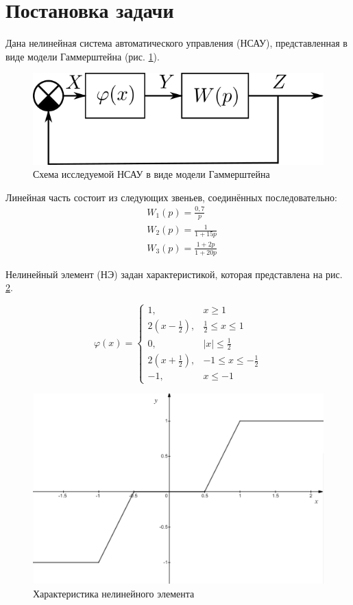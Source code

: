 


	
	
	\setcounter{page}{2}
	\tableofcontents
	\newpage
	
	\section{Постановка задачи}
	
	Дана нелинейная система автоматического управления (НСАУ), представленная в виде модели Гаммерштейна (рис. \ref{scheme}).
	
	\begin{figure}[h]
		\centering\includegraphics[width=.5\textwidth]{png/схема.png}
		\caption{Схема исследуемой НСАУ в виде модели Гаммерштейна}
		\label{scheme}
	\end{figure} 
	
	Линейная часть состоит из следующих звеньев, соединённых последовательно:
	\begin{align*}
		& W_1(p) = \frac{0,7}{p} \\
		& W_2(p) = \frac{1}{1+15p} \\
		& W_3(p) = \frac{1 + 2p}{1 + 20p}
	\end{align*}
	
	Нелинейный элемент (НЭ) задан характеристикой, которая представлена на рис. \ref{NE}.
	
	\begin{equation*}
		\varphi(x) = \begin{cases}
			1, &x\geq 1 \\
			2(x-\frac{1}{2}), &\frac{1}{2} \leq x \leq 1 \\
			0, &|x| \leq \frac{1}{2} \\
			2(x+\frac{1}{2}), &-1\leq x \leq -\frac{1}{2} \\
			-1, &x\leq -1
		\end{cases}
	\end{equation*}
	
	\begin{figure}[h]
		\centering\includegraphics[width=.6\textwidth]{png/НЭ.png}
		\caption{Характеристика нелинейного элемента}
		\label{NE}
	\end{figure}
	
